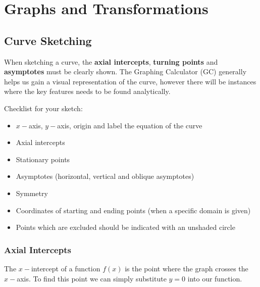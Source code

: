\documentclass[11pt,a4paper]{book}
\begin{document}
\chapter{Graphs and Transformations}

\section{Curve Sketching}
When sketching a curve, the \textbf{axial intercepts}, \textbf{turning points} and \textbf{asymptotes} must be clearly shown. The Graphing Calculator (GC) generally helps us gain a visual representation of the curve, however there will be instances where the key features needs to be found analytically.

Checklist for your sketch:
\begin{itemize}
\item $x-$axis, $y-$axis, origin and label the equation of the curve
\item Axial intercepts
\item Stationary points
\item Asymptotes (horizontal, vertical and oblique asymptotes)
\item Symmetry
\item Coordinates of starting and ending points (when a specific domain is given)
\item Points which are excluded should be indicated with an unshaded circle

\end{itemize}

\subsection{Axial Intercepts}


The $x-$intercept of a function $f(x)$ is the point where the graph
crosses the $x-$axis. To find this point we can simply substitute
$y=0$ into our function.


\medskip{}
\end{document}

